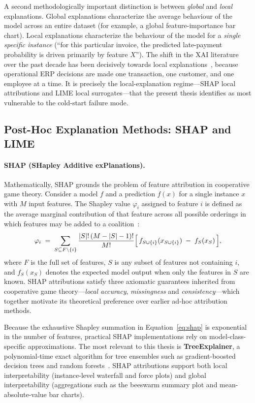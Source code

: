 A second methodologically important distinction is between \emph{global} and
\emph{local} explanations. Global explanations characterize the average
behaviour of the model across an entire dataset (for example, a global
feature-importance bar chart). Local explanations characterize the behaviour
of the model for a \emph{single specific instance} (``for this particular
invoice, the predicted late-payment probability is driven primarily by feature
$X$''). The shift in the XAI literature over the past decade has been
decisively towards local explanations~\citep{lipton2018mythos}, because
operational ERP decisions are made one transaction, one customer, and one
employee at a time. It is precisely the local-explanation regime---SHAP local
attributions and LIME local surrogates---that the present thesis identifies as
most vulnerable to the cold-start failure mode.

\subsection{Post-Hoc Explanation Methods: SHAP and LIME}
\label{subsec:shap-lime}

\paragraph{SHAP (SHapley Additive exPlanations).}
Mathematically, SHAP grounds the problem of feature attribution in cooperative
game theory. Consider a model $f$ and a prediction $f(x)$ for a single instance
$x$ with $M$ input features. The Shapley value $\varphi_i$ assigned to feature
$i$ is defined as the average marginal contribution of that feature across all
possible orderings in which features may be added to a
coalition~\citep{lundberg2017unified}:
\begin{equation}
\varphi_i \;=\; \sum_{S \subseteq F \setminus \{i\}}
\frac{|S|!\,(M - |S| - 1)!}{M!}
\Bigl[\,f_{S \cup \{i\}}(x_{S \cup \{i\}}) \;-\; f_S(x_S)\,\Bigr],
\label{eq:shap}
\end{equation}
where $F$ is the full set of features, $S$ is any subset of features not
containing $i$, and $f_S(x_S)$ denotes the expected model output when only the
features in $S$ are known. SHAP attributions satisfy three axiomatic guarantees
inherited from cooperative game theory---\emph{local accuracy},
\emph{missingness} and \emph{consistency}---which together motivate its
theoretical preference over earlier ad-hoc attribution methods.

Because the exhaustive Shapley summation in Equation~\eqref{eq:shap} is
exponential in the number of features, practical SHAP implementations rely on
model-class-specific approximations. The most relevant to this thesis is
\textbf{TreeExplainer}, a polynomial-time exact algorithm for tree ensembles
such as gradient-boosted decision trees and random
forests~\citep{lundberg2020local}. SHAP attributions support both local
interpretability (instance-level waterfall and force plots) and global
interpretability (aggregations such as the beeswarm summary plot and
mean-absolute-value bar charts).

